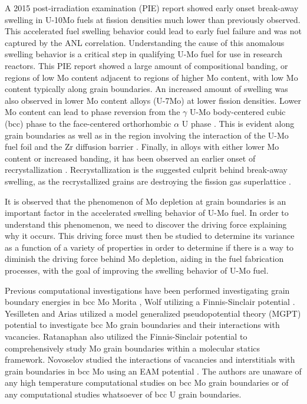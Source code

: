 \documentclass[review]{elsarticle}
\begin{document}
A 2015 post-irradiation examination (PIE) report \cite{afip6report} showed early onset break-away swelling in U-10Mo fuels at fission densities much lower than previously observed. This accelerated fuel swelling behavior could lead to early fuel failure and was not captured by the ANL correlation. Understanding the cause of this anomalous swelling behavior is a critical step in qualifying U-Mo fuel for use in research reactors. This PIE report showed a large amount of compositional banding, or regions of low Mo content adjacent to regions of higher Mo content, with low Mo content typically along grain boundaries. An increased amount of swelling was also observed in lower Mo content alloys (U-7Mo) \cite{vandenberghe2014} at lower fission densities. Lower Mo content can lead to phase reversion from the $\gamma$ U-Mo body-centered cubic (bcc) phase to the face-centered orthorhombic $\alpha$ U phase \cite{janfong2014}. This is evident along grain boundaries as well as in the region involving the interaction of the U-Mo fuel foil and the Zr diffusion barrier \cite{park2015}. Finally, in alloys with either lower Mo content or increased banding, it has been observed an earlier onset of recrystallization \cite{kim2013A}. Recrystallization is the suggested culprit behind break-away swelling, as the recrystallized grains are destroying the fission gas superlattice \cite{vandenberghe2008}. 

It is observed that the phenomenon of Mo depletion at grain boundaries is an important factor in the accelerated swelling behavior of U-Mo fuel. In order to understand this phenomenon, we need to discover the driving force explaining why it occurs. This driving force must then be studied to determine its variance as a function of a variety of properties in order to determine if there is a way to diminish the driving force behind Mo depletion, aiding in the fuel fabrication processes, with the goal of improving the swelling behavior of U-Mo fuel.

Previous computational investigations have been performed investigating grain boundary energies in bcc Mo Morita \cite{morita1997}, Wolf \cite{wolf1989bcc1, wolf1990bcc2} utilizing a Finnis-Sinclair potential \cite{finnis}. Yesilleten and Arias \cite{yesilleten2001} utilized a model generalized pseudopotential theory (MGPT) \cite{moriarty1988} potential to investigate bcc Mo grain boundaries and their interactions with vacancies. Ratanaphan \cite{ratanaphan2015} also utilized the Finnis-Sinclair potential \cite{finnis} to comprehensively study Mo grain boundaries within a molecular statics framework. Novoselov \cite{novoselov2014} studied the interactions of vacancies and interstitials with grain boundaries in bcc Mo using an EAM \cite{daw1984, daw1993} potential \cite{starikov2011}. The authors are unaware of any high temperature computational studies on bcc Mo grain boundaries or of any computational studies whatsoever of bcc U grain boundaries.
\end{document}
